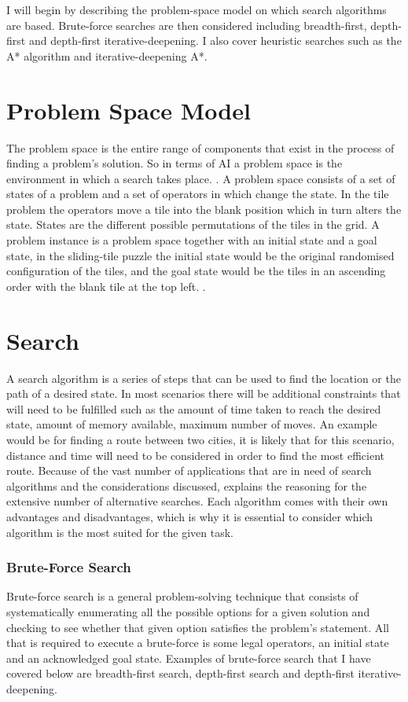 \documentclass[review]{cmpreport}
\begin{document}
I will begin by describing the problem-space model on which search algorithms are based. Brute-force searches are then considered including breadth-first, depth-first and depth-first iterative-deepening. I also cover heuristic searches such as the A* algorithm and iterative-deepening A*.


\section{Problem Space Model} \label{sec1}

The problem space is the entire range of components that exist in the process of finding a problem's solution. So in terms of AI a problem space is the environment in which a search takes place.  \citep{Newell:1972:HPS:1095704}. A problem space consists of a set of states of a problem and a  set of operators in which change the state. In the tile problem the operators move a tile into the blank position which in turn alters the state. States are the different possible permutations of the tiles in the grid. A problem instance is a problem space together with an initial state and a goal state, in the sliding-tile puzzle the initial state would be the original randomised configuration of the tiles, and the goal state would be the tiles in an ascending order with the blank tile at the top left. \citep{DBLP:journals/mima/Korf95}.
\section{Search} \label{sec1}
A search algorithm is a series of steps that can be used to find the location or the path of a desired state. In most scenarios there will be additional constraints that will need to be fulfilled such as the amount of time taken to reach the desired state, amount of memory available, maximum number of moves. An example would be for finding a route between two cities, it is likely that for this scenario, distance and time will need to be considered in order to find the most efficient route. Because of the vast number of applications that are in need of search algorithms and the considerations discussed, explains the reasoning for the extensive number of alternative searches. Each algorithm comes with their own advantages and disadvantages, which is why it is essential to consider which algorithm is the most suited for the given task.

\subsubsection{Brute-Force Search} \label{sec1}
Brute-force search is a general problem-solving technique that consists of systematically enumerating all the possible options for a given solution and checking to see whether that given option satisfies the problem's statement. All that is required to execute a brute-force is some legal operators, an initial state and an acknowledged goal state. Examples of brute-force search that I have covered below are breadth-first search, depth-first search and depth-first iterative-deepening.
\end{document}
